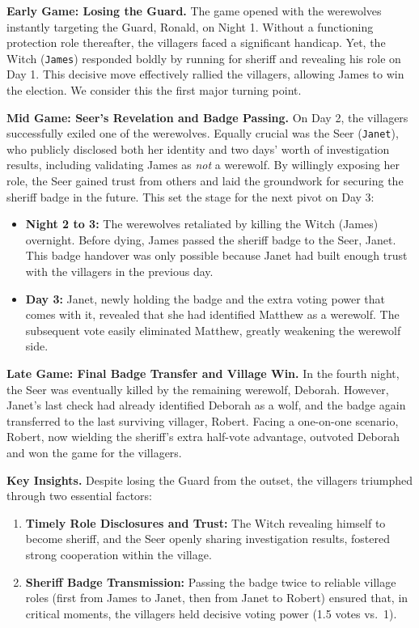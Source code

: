 \textbf{Early Game: Losing the Guard.}
The game opened with the werewolves instantly targeting the Guard, Ronald, on Night 1. Without a functioning protection role thereafter, the villagers faced a significant handicap. Yet, the Witch (\texttt{James}) responded boldly by running for sheriff and revealing his role on Day 1. This decisive move effectively rallied the villagers, allowing James to win the election. We consider this the first major turning point.

\textbf{Mid Game: Seer’s Revelation and Badge Passing.}
On Day 2, the villagers successfully exiled one of the werewolves. Equally crucial was the Seer (\texttt{Janet}), who publicly disclosed both her identity and two days’ worth of investigation results, including validating James as \emph{not} a werewolf. By willingly exposing her role, the Seer gained trust from others and laid the groundwork for securing the sheriff badge in the future. This set the stage for the next pivot on Day 3:

\begin{itemize}
    \item \textbf{Night 2 to 3:} The werewolves retaliated by killing the Witch (James) overnight. Before dying, James passed the sheriff badge to the Seer, Janet. This badge handover was only possible because Janet had built enough trust with the villagers in the previous day.
    \item \textbf{Day 3:} Janet, newly holding the badge and the extra voting power that comes with it, revealed that she had identified Matthew as a werewolf. The subsequent vote easily eliminated Matthew, greatly weakening the werewolf side.
\end{itemize}

\textbf{Late Game: Final Badge Transfer and Village Win.}
In the fourth night, the Seer was eventually killed by the remaining werewolf, Deborah. However, Janet's last check had already identified Deborah as a wolf, and the badge again transferred to the last surviving villager, Robert. Facing a one-on-one scenario, Robert, now wielding the sheriff’s extra half-vote advantage, outvoted Deborah and won the game for the villagers.

\textbf{Key Insights.}
Despite losing the Guard from the outset, the villagers triumphed through two essential factors:
\begin{enumerate}
    \item \textbf{Timely Role Disclosures and Trust:} The Witch revealing himself to become sheriff, and the Seer openly sharing investigation results, fostered strong cooperation within the village.
    \item \textbf{Sheriff Badge Transmission:} Passing the badge twice to reliable village roles (first from James to Janet, then from Janet to Robert) ensured that, in critical moments, the villagers held decisive voting power (1.5 votes vs.\ 1).
\end{enumerate}

